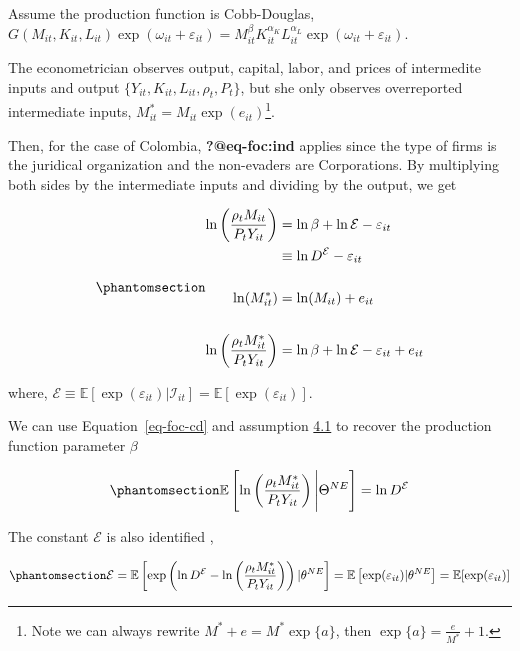 \documentclass[
  12pt]{article}
\theoremstyle{definition}
\theoremstyle{remark}
\begin{document}
Assume the production function is Cobb-Douglas,
\(G(M_{it}, K_{it}, L_{it})\exp(\omega_{it}+\varepsilon_{it})=M^{\beta}_{it}K_{it}^{\alpha_K}L_{it}^{\alpha_L}\exp(\omega_{it}+\varepsilon_{it})\).

The econometrician observes output, capital, labor, and prices of
intermedite inputs and output \(\{Y_{it},K_{it},L_{it},\rho_t, P_t\}\),
but she only observes overreported intermediate inputs,
\(M^*_{it}=M_{it}\exp(e_{it})\)\footnote{Note we can always rewrite
  \(M^*+e=M^*\exp\{a\}\), then \(\exp\{a\}=\frac{e}{M^*}+1\).}.

Then, for the case of Colombia, \textbf{?@eq-foc:ind} applies since the
type of firms is the juridical organization and the non-evaders are
Corporations. By multiplying both sides by the intermediate inputs and
dividing by the output, we get

\begin{equation}\phantomsection\label{eq-foc-cd}{
\begin{aligned}
    \ln\left(\frac{\rho_t M_{it}}{P_{t}Y_{it}}\right) &=\ln\beta + \ln \mathcal{E}- \varepsilon_{it} \\
    &\equiv \ln D^{\mathcal{E}}- \varepsilon_{it} \\
    &\\
    \ln(M^*_{it})&=\ln(M_{it})+e_{it} \\ 
    &\\
    \ln\left(\frac{\rho_t M^*_{it}}{P_{t}Y_{it}}\right) &=\ln\beta + \ln \mathcal{E}- \varepsilon_{it}+e_{it} \\
\end{aligned}
}\end{equation}

where,
\(\mathcal{E}\equiv \mathbb{E}[\exp(\varepsilon_{it})|\mathcal{I}_{it}]=\mathbb{E}[\exp(\varepsilon_{it})]\).

We can use Equation~\ref{eq-foc-cd} and assumption
\hyperref[ass-non-ev]{4.1} to recover the production function parameter
\(\beta\)

\begin{equation}\phantomsection\label{eq-foc-cd-exp}{
    \mathbb{E}\left[\ln\left(\frac{\rho_t M^*_{it}}{P_{t}Y_{it}}\right)\Bigg| \Theta^{NE}\right]=\ln D^{\mathcal{E}}
}\end{equation}

The constant \(\mathcal{E}\) is also identified \citep{Gandhi2020},

\begin{equation}\phantomsection\label{eq-id-E}{
\mathcal{E}=\mathbb{E}\left[\exp\left(\ln D^{\mathcal{E}}- \ln\left(\frac{\rho_t M^*_{it}}{P_{t}Y_{it}}\right)\right)|\theta^{NE}\right]=\mathbb{E}\left[\exp(\varepsilon_{it})|\theta^{NE}\right]=\mathbb{E}[\exp(\varepsilon_{it})]
}\end{equation}
\end{document}
